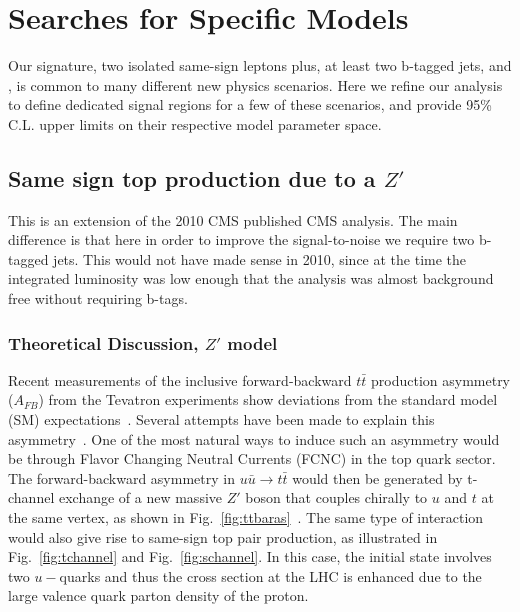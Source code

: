 \section{Searches for Specific Models}
\label{sec:stampCollecting}

Our signature, two isolated same-sign leptons plus, at least two b-tagged jets, and \met, 
is common to many different new physics scenarios.
Here we refine our analysis to define dedicated signal regions for a few of these scenarios,
and provide 95\% C.L. upper limits on their respective model parameter space.


\subsection{Same sign top production due to a $Z'$}
\label{sec:sstops}

This is an extension of the 2010 CMS published CMS analysis\cite{sstop}.
The main difference is that here in order to improve the signal-to-noise
we require two b-tagged jets.  This would not have made sense in 2010, since 
at the time the integrated luminosity was low enough that the analysis was almost
background free without requiring b-tags.

\subsubsection{Theoretical Discussion, $Z'$ model}

Recent measurements of the inclusive forward-backward $t\bar{t}$ production 
asymmetry ($A_{FB}$) from the 
Tevatron experiments show deviations from the standard model 
(SM) expectations~\cite{d0:fwtop, cdf:fwtop1, cdf:fwtop2}.
Several attempts have been made to explain this asymmetry~\cite{fcnczprime, Buckley, Gresham, zoltan}. 
One of the most natural ways to induce such an asymmetry would be through
Flavor Changing Neutral Currents (FCNC) in the top quark sector. 
The forward-backward asymmetry in $u\bar{u} \to t\bar{t}$ would then be generated
by t-channel exchange of a new massive $Z'$ boson that couples chirally to
$u$ and $t$ at the same vertex, as shown in Fig.~\ref{fig:ttbaras}~\cite{fcnczprime}.
The same type of interaction would also give rise to same-sign top pair production, 
as illustrated in Fig.~\ref{fig:tchannel} and Fig.~\ref{fig:schannel}. 
In this case, the initial state involves two $u-$quarks and 
thus the cross section at the LHC is enhanced due 
to the large valence quark parton density of the proton. 

